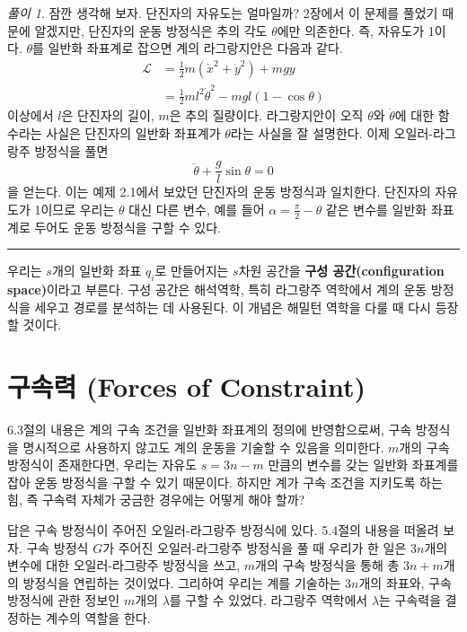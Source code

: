 \documentclass[chapter, oneside, b5paper]{oblivoir}
\theoremstyle{plain}
\theoremstyle{definition}
\theoremstyle{remark}
\newtheorem*{solution}{풀이}
\begin{document}
\begin{solution}
    잠깐 생각해 보자. 단진자의 자유도는 얼마일까? 2장에서 이 문제를 풀었기 때문에 알겠지만, 단진자의 운동 방정식은 추의 각도 $\theta$에만 의존한다. 즉, 자유도가 1이다. $\theta$를 일반화 좌표계로 잡으면 계의 라그랑지안은 다음과 같다.
    \begin{equation}
    \begin{aligned}
        \mathcal{L} &= \frac{1}{2}m(\dot{x}^2 + \dot{y}^2) + mgy \\
        &= \frac{1}{2}ml^2 \dot{\theta}^2 -mgl(1-\cos{\theta})
    \end{aligned}
    \label{eq:6.19}
    \end{equation}
    이상에서 $l$은 단진자의 길이, $m$은 추의 질량이다. 라그랑지안이 오직 $\theta$와 $\dot{\theta}$에 대한 함수라는 사실은 단진자의 일반화 좌표계가 $\theta$라는 사실을 잘 설명한다. 이제 오일러-라그랑주 방정식을 풀면
    \begin{equation}
        \ddot{\theta} + \frac{g}{l}\sin{\theta} = 0
    \end{equation}
    을 얻는다. 이는 예제 2.1에서 보았던 단진자의 운동 방정식과 일치한다. 단진자의 자유도가 1이므로 우리는 $\theta$ 대신 다른 변수, 예를 들어 $\alpha = \frac{\pi}{2} - \theta$ 같은 변수를 일반화 좌표계로 두어도 운동 방정식을 구할 수 있다.
\end{solution}

\noindent\rule{\textwidth}{0.8pt} %
\vspace{1em} %

우리는 $s$개의 일반화 좌표 $q_i$로 만들어지는 $s$차원 공간을 \textbf{구성 공간(configuration space)}이라고 부른다. 구성 공간은 해석역학, 특히 라그랑주 역학에서 계의 운동 방정식을 세우고 경로를 분석하는 데 사용된다. 이 개념은 해밀턴 역학을 다룰 때 다시 등장할 것이다.

\section{구속력 (Forces of Constraint)}
6.3절의 내용은 계의 구속 조건을 일반화 좌표계의 정의에 반영함으로써, 구속 방정식을 명시적으로 사용하지 않고도 계의 운동을 기술할 수 있음을 의미한다. $m$개의 구속 방정식이 존재한다면, 우리는 자유도 $s=3n-m$ 만큼의 변수를 갖는 일반화 좌표계를 잡아 운동 방정식을 구할 수 있기 때문이다. 하지만 계가 구속 조건을 지키도록 하는 힘, 즉 구속력 자체가 궁금한 경우에는 어떻게 해야 할까?

답은 구속 방정식이 주어진 오일러-라그랑주 방정식에 있다. 5.4절의 내용을 떠올려 보자. 구속 방정식 $G$가 주어진 오일러-라그랑주 방정식을 풀 때 우리가 한 일은 $3n$개의 변수에 대한 오일러-라그랑주 방정식을 쓰고, $m$개의 구속 방정식을 통해 총 $3n+m$개의 방정식을 연립하는 것이었다. 그리하여 우리는 계를 기술하는 $3n$개의 좌표와, 구속 방정식에 관한 정보인 $m$개의 $\lambda$를 구할 수 있었다. 라그랑주 역학에서 $\lambda$는 구속력을 결정하는 계수의 역할을 한다.
\end{document}
